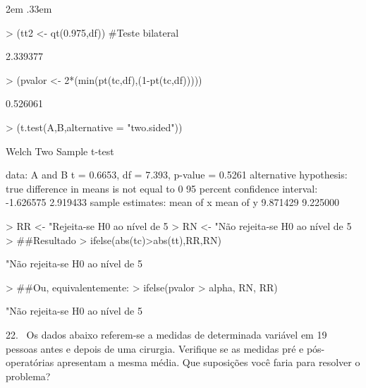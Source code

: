\documentclass{article}
\newenvironment{ManualExercise}
  {\begin{list}{}{\leftmargin \QuestionIndent
    \partopsep0pt \parsep\parskip \topsep\QuestionBefore
    \itemsep\QuestionBefore \labelwidth2em
    \labelsep.33em
    \usecounter{Question}}}
  {\end{list}}
\begin{document}
\begin{Exercise}
\begin{ManualExercise}
\begin{Schunk}
\begin{Sinput}
> (tt2 <- qt(0.975,df)) #Teste bilateral
\end{Sinput}
\begin{Soutput}
[1] 2.339377
\end{Soutput}
\begin{Sinput}
> (pvalor <- 2*(min(pt(tc,df),(1-pt(tc,df)))))
\end{Sinput}
\begin{Soutput}
[1] 0.526061
\end{Soutput}
\begin{Sinput}
> (t.test(A,B,alternative = "two.sided"))
\end{Sinput}
\begin{Soutput}
	Welch Two Sample t-test

data:  A and B
t = 0.6653, df = 7.393, p-value = 0.5261
alternative hypothesis: true difference in means is not equal to 0
95 percent confidence interval:
 -1.626575  2.919433
sample estimates:
mean of x mean of y 
 9.871429  9.225000 
\end{Soutput}
\begin{Sinput}
> RR <- "Rejeita-se H0 ao nível de 5%
> RN <- "Não rejeita-se H0 ao nível de 5%
> ##Resultado
> ifelse(abs(tc)>abs(tt),RR,RN)
\end{Sinput}
\begin{Soutput}
[1] "Não rejeita-se H0 ao nível de 5%
\end{Soutput}
\begin{Sinput}
> ##Ou, equivalentemente:
> ifelse(pvalor > alpha, RN, RR)
\end{Sinput}
\begin{Soutput}
[1] "Não rejeita-se H0 ao nível de 5%
\end{Soutput}
\end{Schunk}

\item[22.~]Os dados abaixo referem-se a medidas de determinada variável em 19 pessoas antes e depois de uma cirurgia. Verifique se as medidas pré e pós-operatórias 
apresentam a mesma média. Que suposições você faria para resolver o problema?


\end{ManualExercise}
\end{Exercise}
\end{document}
